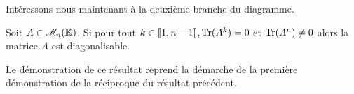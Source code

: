 Intéressons-nous maintenant à la deuxième branche du diagramme.
\begin{prop}
    Soit $A \in \mathscr{M}_n(\mathbb{K})$. Si pour tout $k \in \llbracket 1, n-1 \rrbracket, \mathrm{Tr}(A^k) = 0$ et $\mathrm{Tr}(A^n) \not= 0$ alors la matrice $A$ est diagonalisable. 
\end{prop}
Le démonstration de ce résultat reprend la démarche de la première démonstration de la réciproque du résultat précédent.
\newcommand{\vandermondepartiel}{
\left(\begin{gathered}
    \tikzpicture[every node/.style={anchor=south west}]
        \node[minimum width=1.5cm,minimum height=0.5cm] at (0.125,1.25) {\LARGE $V_k$};
        
        \node[minimum width=0.5cm,minimum height=0.5cm] at (0,0) {$\star$};
        \node[minimum width=0.5cm,minimum height=0.5cm] at (0.55,0) {$\cdots$};
        \node[minimum width=0.5cm,minimum height=0.5cm] at (1.25,0) {$\star$};
        
        \node[minimum width=0.5cm,minimum height=0.5cm] at (0,0.375) {$\vdots$};
        \node[minimum width=0.5cm,minimum height=0.5cm] at (1.25,0.375) {$\vdots$};
        
        \node[minimum width=0.5cm,minimum height=0.5cm] at (0,0.75) {$\star$};
        \node[minimum width=0.5cm,minimum height=0.5cm] at (0.55,0.75) {$\cdots$};
        \node[minimum width=0.5cm,minimum height=0.5cm] at (1.25,0.75) {$\star$};

        \draw (0, 1.25) -- (1.75, 1.25);
    \endtikzpicture
    \end{gathered}\right)
}
